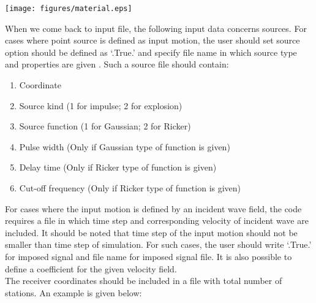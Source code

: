 \begin{center}
\leavevmode
\texttt{[image: figures/material.eps]} 
\label{mat} 
\vspace{1cm}
\end{center}


When we come back to input file, the following input data concerns sources. For cases where point source is defined as input motion, the user should set source option should be defined as ‘.True.’ and specify file name in which source type and properties are given . Such a source file should contain: \\

\begin{enumerate}

\item Coordinate
\item Source kind (1 for impulse; 2 for explosion)
\item Source function (1 for Gaussian; 2 for Ricker)
\item Pulse width (Only if Gaussian type of function is given)
\item Delay time  (Only if Ricker type of function is given)
\item Cut-off frequency (Only if Ricker type of function is given)

\end{enumerate}


For cases where the input motion is defined by an incident wave field, the code requires a file in which time step and corresponding velocity of incident wave are included. It should be noted that time step of the input motion should not be smaller than time step of simulation. For such cases, the user should write ‘.True.’ for imposed signal and file name for imposed signal file. It is also possible to define a coefficient for the given velocity field. \\

The receiver coordinates should be included in a file with total number of stations. An example is given below: \\

